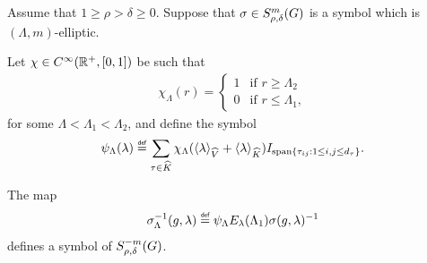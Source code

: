 \begin{proposition}
\label{proposition:inverse_of_elliptic_symbol}
    Assume that $1 \geq \rho > \delta \geq 0$.
    Suppose that $\sigma \in S^{m}_{\rho, \delta}(G)$ is a symbol which is $(\Lambda, m)$-elliptic.

    Let $\chi \in {C^\infty(\mathbb{R}^+, [0, 1])}$ be such that
    \begin{align*}
        \chi_\Lambda(r) =
        \begin{cases}
            1 & \text{if } r \geq \Lambda_2\\
            0 & \text{if } r \leq \Lambda_1,
        \end{cases}
    \end{align*}
    for some $\Lambda < \Lambda_1 < \Lambda_2$,
    and define the symbol
    \begin{align*}
        \psi_\Lambda(\lambda)
        \defeq \sum_{\tau \in \dualGroup \CompactGroup}
        \chi_\Lambda(\JapaneseBracket \VectorSpace \lambda + \JapaneseBracket \CompactGroup \lambda) \Id {\Span \{\tau_{i j} : 1 \leq i, j \leq \dimRep \tau\}}.
    \end{align*}

    The map
    \begin{align*}
        \sigma_\Lambda^{-1}(g, \lambda)
        \defeq \psi_\Lambda E_\lambda(\Lambda_1) \sigma(g, \lambda)^{-1}
    \end{align*}
    defines a symbol of $S^{-m}_{\rho, \delta}(G)$.
\end{proposition}
